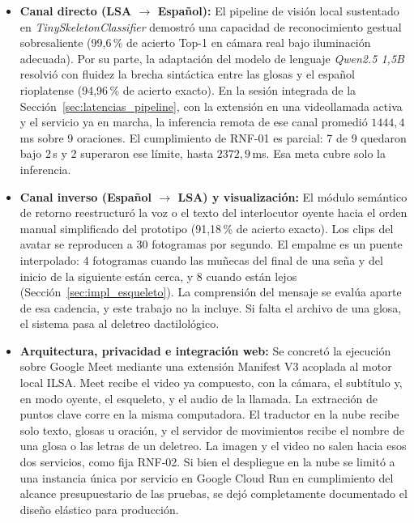\begin{itemize}
    \item \textbf{Canal directo (LSA $\rightarrow$ Español):} El pipeline de visión local sustentado en \textit{TinySkeletonClassifier} demostró una capacidad de reconocimiento gestual sobresaliente (99{,}6\,\% de acierto Top-1 en cámara real bajo iluminación adecuada). Por su parte, la adaptación del modelo de lenguaje \textit{Qwen2.5 1,5B} resolvió con fluidez la brecha sintáctica entre las glosas y el español rioplatense (94{,}96\,\% de acierto exacto). En la sesión integrada de la Sección~\ref{sec:latencias_pipeline}, con la extensión en una videollamada activa y el servicio ya en marcha, la inferencia remota de ese canal promedió $1444{,}4$\,ms sobre 9 oraciones. El cumplimiento de RNF-01 es parcial: 7 de 9 quedaron bajo 2\,s y 2 superaron ese límite, hasta $2372{,}9$\,ms. Esa meta cubre solo la inferencia.
    
    \item \textbf{Canal inverso (Español $\rightarrow$ LSA) y visualización:} El módulo semántico de retorno reestructuró la voz o el texto del interlocutor oyente hacia el orden manual simplificado del prototipo (91{,}18\,\% de acierto exacto). Los clips del avatar se reproducen a 30 fotogramas por segundo. El empalme es un puente interpolado: 4 fotogramas cuando las muñecas del final de una seña y del inicio de la siguiente están cerca, y 8 cuando están lejos (Sección~\ref{sec:impl_esqueleto}). La comprensión del mensaje se evalúa aparte de esa cadencia, y este trabajo no la incluye. Si falta el archivo de una glosa, el sistema pasa al deletreo dactilológico.
    
    \item \textbf{Arquitectura, privacidad e integración web:} Se concretó la ejecución sobre Google Meet mediante una extensión Manifest V3 acoplada al motor local ILSA. Meet recibe el video ya compuesto, con la cámara, el subtítulo y, en modo oyente, el esqueleto, y el audio de la llamada. La extracción de puntos clave corre en la misma computadora. El traductor en la nube recibe solo texto, glosas u oración, y el servidor de movimientos recibe el nombre de una glosa o las letras de un deletreo. La imagen y el video no salen hacia esos dos servicios, como fija RNF-02. Si bien el despliegue en la nube se limitó a una instancia única por servicio en Google Cloud Run en cumplimiento del alcance presupuestario de las pruebas, se dejó completamente documentado el diseño elástico para producción.
\end{itemize}

